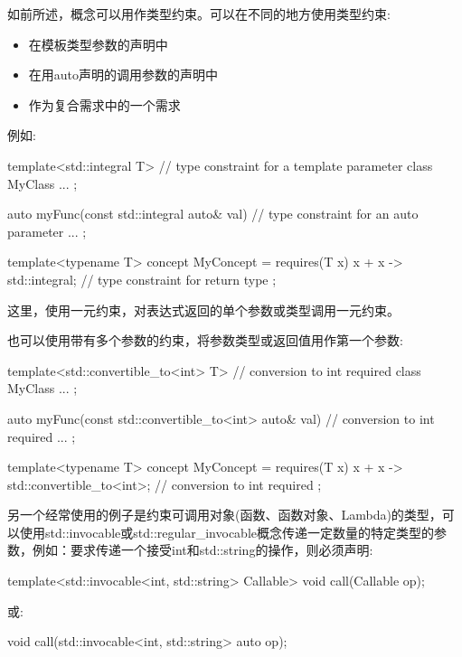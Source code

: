 如前所述，概念可以用作类型约束。可以在不同的地方使用类型约束:

\begin{itemize}
\item
在模板类型参数的声明中

\item
在用auto声明的调用参数的声明中

\item
作为复合需求中的一个需求
\end{itemize}

例如:

\begin{cpp}
template<std::integral T> // type constraint for a template parameter
class MyClass {
	...
};

auto myFunc(const std::integral auto& val) { // type constraint for an auto parameter
	...
};

template<typename T>
concept MyConcept = requires(T x) {
		{ x + x } -> std::integral; // type constraint for return type
	};
\end{cpp}

这里，使用一元约束，对表达式返回的单个参数或类型调用一元约束。


也可以使用带有多个参数的约束，将参数类型或返回值用作第一个参数:

\begin{cpp}
template<std::convertible_to<int> T> // conversion to int required
class MyClass {
	...
};

auto myFunc(const std::convertible_to<int> auto& val) { // conversion to int required
	...
};

template<typename T>
concept MyConcept = requires(T x) {
		{ x + x } -> std::convertible_to<int>; // conversion to int required
	};
\end{cpp}

另一个经常使用的例子是约束可调用对象(函数、函数对象、Lambda)的类型，可以使用std::invocable或std::regular\_invocable概念传递一定数量的特定类型的参数，例如：要求传递一个接受int和std::string的操作，则必须声明:

\begin{cpp}
template<std::invocable<int, std::string> Callable>
void call(Callable op);
\end{cpp}

或:

\begin{cpp}
void call(std::invocable<int, std::string> auto op);
\end{cpp}

